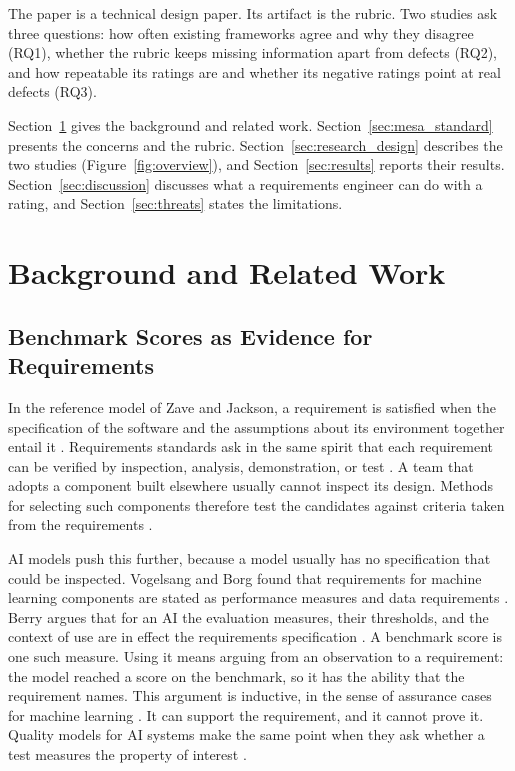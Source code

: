 \documentclass[runningheads]{llncs}
\begin{document}
The paper is a technical design paper. Its artifact is the rubric. Two studies ask three questions: how often existing frameworks agree and why they disagree (RQ1), whether the rubric keeps missing information apart from defects (RQ2), and how repeatable its ratings are and whether its negative ratings point at real defects (RQ3).

Section~\ref{sec:background} gives the background and related work. Section~\ref{sec:mesa_standard} presents the concerns and the rubric. Section~\ref{sec:research_design} describes the two studies (Figure~\ref{fig:overview}), and Section~\ref{sec:results} reports their results. Section~\ref{sec:discussion} discusses what a requirements engineer can do with a rating, and Section~\ref{sec:threats} states the limitations.

\section{Background and Related Work}
\label{sec:background}

\subsection{Benchmark Scores as Evidence for Requirements}
In the reference model of Zave and Jackson, a requirement is satisfied when the specification of the software and the assumptions about its environment together entail it \cite{zave_jackson_1997}. Requirements standards ask in the same spirit that each requirement can be verified by inspection, analysis, demonstration, or test \cite{iso_iec_ieee_29148_2018}. A team that adopts a component built elsewhere usually cannot inspect its design. Methods for selecting such components therefore test the candidates against criteria taken from the requirements \cite{maiden_ncube_cots_1998}.

AI models push this further, because a model usually has no specification that could be inspected. Vogelsang and Borg found that requirements for machine learning components are stated as performance measures and data requirements \cite{vogelsang_borg_re4ml_2019}. Berry argues that for an AI the evaluation measures, their thresholds, and the context of use are in effect the requirements specification \cite{berry_re4ai_2022}. A benchmark score is one such measure. Using it means arguing from an observation to a requirement: the model reached a score on the benchmark, so it has the ability that the requirement names. This argument is inductive, in the sense of assurance cases for machine learning \cite{hawkins_amlas_2021}. It can support the requirement, and it cannot prove it. Quality models for AI systems make the same point when they ask whether a test measures the property of interest \cite{iso_iec_25059_2023,lewis_quality_model_ml_2026}.
\end{document}
